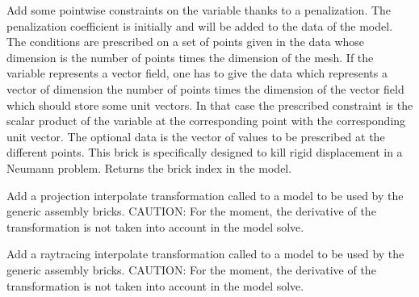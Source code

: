 \documentclass[a4paper,11pt,english]{sphinxmanual}
\begin{document}
\begin{fulllineitems}
\begin{fulllineitems}
Add some pointwise constraints on the variable  thanks to
a penalization. The penalization coefficient is initially
 and will be added to the data of the model.
The conditions are prescribed on a set of points given in the data
 whose dimension is the number of points times the dimension
of the mesh.
If the variable represents a vector field, one has to give the data
 which represents a vector of dimension the number of
points times the dimension of the vector field which should store some
unit vectors. In that case the prescribed constraint is the scalar
product of the variable at the corresponding point with the corresponding
unit vector.
The optional data  is the vector of values to be prescribed
at the different points.
This brick is specifically designed to kill rigid displacement
in a Neumann problem.
Returns the brick index in the model.

\end{fulllineitems}


\begin{fulllineitems}
\label{\detokenize{python/cmdref_Model:getfem.Model.add_projection_transformation}}
Add a projection interpolate transformation called  to a model
to be used by the generic assembly bricks.
CAUTION: For the moment, the derivative of the
transformation is not taken into account in the model solve.

\end{fulllineitems}


\begin{fulllineitems}
\label{\detokenize{python/cmdref_Model:getfem.Model.add_raytracing_transformation}}
Add a raytracing interpolate transformation called  to a model
to be used by the generic assembly bricks.
CAUTION: For the moment, the derivative of the
transformation is not taken into account in the model solve.


\end{fulllineitems}
\end{fulllineitems}
\end{document}
